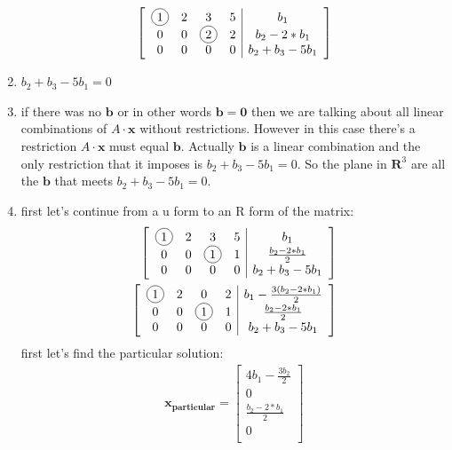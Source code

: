 \documentclass[a4paper,11pt]{article}
\newcommand*\circled[1]{\tikz[baseline=(char.base)]{
             \node[shape=circle,draw,inner sep=2pt] (char) {#1};}}
\newcommand{\mybf}[1]{\boldsymbol{#1}}
\begin{document}
\begin{enumerate}
\begin{align}
\left[
\begin{array}{cccc|c}
\circled{1} & 2 &           3 & 5 & b_1 \\
0           & 0 & \circled{2} & 2 & b_2-2*b_1  \\
0           & 0 &           0 & 0 & b_2+b_3-5b_1 \\
\end{array}
\right]
\end{align}
\item $b_2+b_3-5b_1 = 0$
\item if there was no $\mybf{b}$ or in other words $\mybf{b}=\mybf{0}$ then we are talking about all linear combinations of $A \cdot \mybf{x}$ without restrictions. However in this case there's a restriction $A \cdot \mybf{x}$ must equal $\mybf{b}$. Actually $\mybf{b}$ is a linear combination and the only restriction that it imposes is $b_2+b_3-5b_1 = 0$. So the plane in $\mybf{R}^3$ are all the $\mybf{b}$ that meets $b_2+b_3-5b_1 = 0$.
\item first let's continue from a u form to an R form of the matrix:
\begin{align}
\left[
\begin{array}{cccc|c}
\circled{1} & 2 &           3 & 5 & b_1 \\
0           & 0 & \circled{1} & 1 & \frac{b_2-2*b_1}{2}  \\
0           & 0 &           0 & 0 & b_2+b_3-5b_1 \\
\end{array}
\right] \\
\left[
\begin{array}{cccc|c}
\circled{1} & 2 &           0 & 2 & b_1-\frac{3(b_2-2*b_1)}{2} \\
0           & 0 & \circled{1} & 1 & \frac{b_2-2*b_1}{2}  \\
0           & 0 &           0 & 0 & b_2+b_3-5b_1 \\
\end{array}
\right]\\
\end{align}
first let's find the particular solution:
\begin{align}
\mybf{x_{particular}} = 
\begin{bmatrix}
4b_1-\frac{3b_2}{2} \\
0 \\
\frac{b_2-2*b_1}{2}  \\
0 \\
\end{bmatrix}

\end{align}
\end{enumerate}
\end{document}

